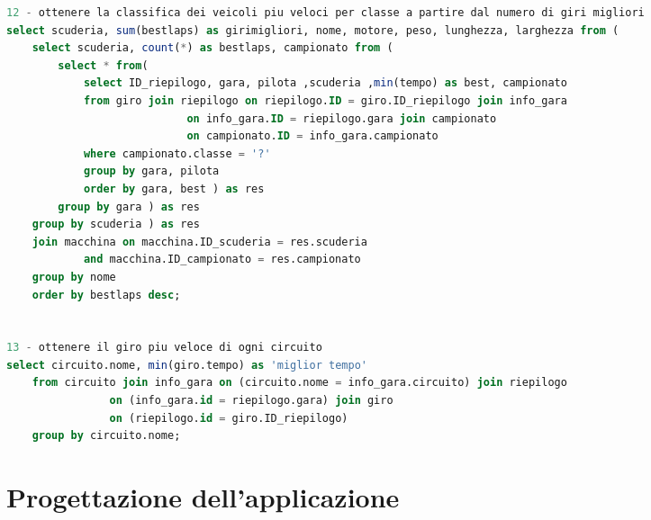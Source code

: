\documentclass[a4paper,12pt]{report}
\begin{document}
{\begin{adjustwidth}{-85pt}{1pt}
\begin{lstlisting}[language=SQL]
12 - ottenere la classifica dei veicoli piu veloci per classe a partire dal numero di giri migliori
select scuderia, sum(bestlaps) as girimigliori, nome, motore, peso, lunghezza, larghezza from (
	select scuderia, count(*) as bestlaps, campionato from (
		select * from(
			select ID_riepilogo, gara, pilota ,scuderia ,min(tempo) as best, campionato
			from giro join riepilogo on riepilogo.ID = giro.ID_riepilogo join info_gara 
							on info_gara.ID = riepilogo.gara join campionato 
							on campionato.ID = info_gara.campionato
			where campionato.classe = '?'
			group by gara, pilota
			order by gara, best ) as res
		group by gara ) as res
	group by scuderia ) as res
	join macchina on macchina.ID_scuderia = res.scuderia 
			and macchina.ID_campionato = res.campionato
	group by nome
	order by bestlaps desc;
	
	
13 - ottenere il giro piu veloce di ogni circuito
select circuito.nome, min(giro.tempo) as 'miglior tempo'
	from circuito join info_gara on (circuito.nome = info_gara.circuito) join riepilogo 
				on (info_gara.id = riepilogo.gara) join giro 
				on (riepilogo.id = giro.ID_riepilogo)
	group by circuito.nome;

			\end{lstlisting}
			\end{adjustwidth}
\chapter{Progettazione dell'applicazione}
		{\fontsize{12.5}{20}\selectfont
}}
\end{document}
